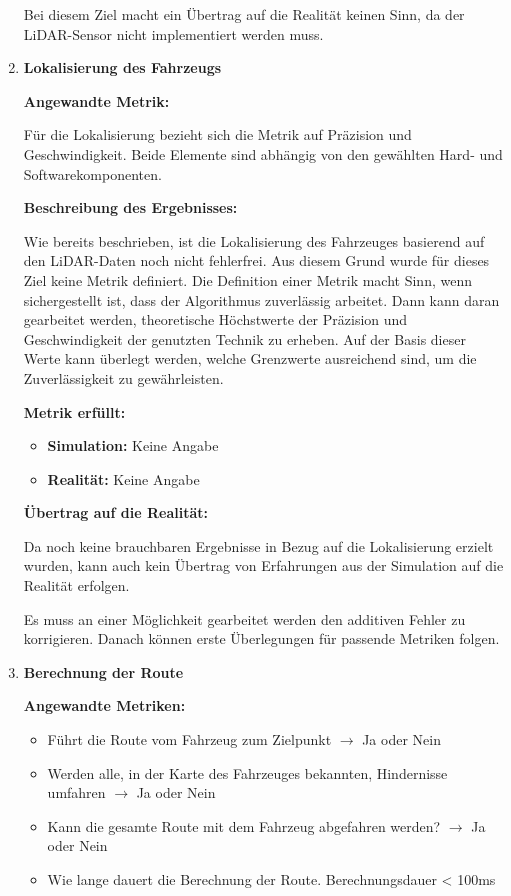 \begin{enumerate}[leftmargin=*]
    Bei diesem Ziel macht ein Übertrag auf die Realität keinen Sinn, da der LiDAR-Sensor nicht implementiert werden muss.

    \item \textbf{Lokalisierung des Fahrzeugs}

    \textbf{Angewandte Metrik:}

    Für die Lokalisierung bezieht sich die Metrik auf Präzision und Geschwindigkeit. 
    Beide Elemente sind abhängig von den gewählten Hard- und Softwarekomponenten. 

    \textbf{Beschreibung des Ergebnisses:}

    Wie bereits beschrieben, ist die Lokalisierung des Fahrzeuges basierend auf den LiDAR-Daten noch nicht fehlerfrei.
    Aus diesem Grund wurde für dieses Ziel keine Metrik definiert. 
    Die Definition einer Metrik macht Sinn, wenn sichergestellt ist, dass der Algorithmus zuverlässig arbeitet.
    Dann kann daran gearbeitet werden, theoretische Höchstwerte der Präzision und Geschwindigkeit der genutzten Technik zu erheben.
    Auf der Basis dieser Werte kann überlegt werden, welche Grenzwerte ausreichend sind, um die Zuverlässigkeit zu gewährleisten.    

    \textbf{Metrik erfüllt:}
    \begin{itemize}
        \item \textbf{Simulation:} Keine Angabe
        \item \textbf{Realität:} Keine Angabe
    \end{itemize}
    
    \textbf{Übertrag auf die Realität:}

    Da noch keine brauchbaren Ergebnisse in Bezug auf die Lokalisierung erzielt wurden, 
    kann auch kein Übertrag von Erfahrungen aus der Simulation auf die Realität erfolgen.

    Es muss an einer Möglichkeit gearbeitet werden den additiven Fehler zu korrigieren. 
    Danach können erste Überlegungen für passende Metriken folgen.
    
    \item \textbf{Berechnung der Route}

    \textbf{Angewandte Metriken:}

    \begin{itemize}
        \item Führt die Route vom Fahrzeug zum Zielpunkt $\to$ Ja oder Nein
        \item Werden alle, in der Karte des Fahrzeuges bekannten, Hindernisse umfahren $\to$ Ja oder Nein
        \item Kann die gesamte Route mit dem Fahrzeug abgefahren werden? $\to$ Ja oder Nein
        \item Wie lange dauert die Berechnung der Route. Berechnungsdauer < 100ms
    \end{itemize}
    

\end{enumerate}
